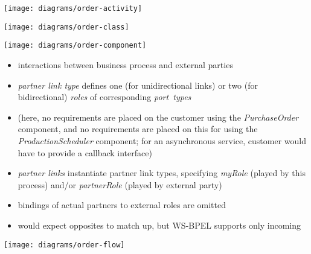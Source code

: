 \documentclass{sepslide-soa-faked} %
\begin{document}
\begin{slide}
\begin{center}
\texttt{[image: diagrams/order-activity]}
\end{center}
\end{slide}

\begin{slide}
\begin{center}
\texttt{[image: diagrams/order-class]}
\end{center}
\end{slide}

\begin{slide}
\begin{center}
\texttt{[image: diagrams/order-component]}
\end{center}
\end{slide}

\begin{slide}
\begin{itemize}
\item interactions between business process and external parties
\item \emph{partner link type} defines one (for unidirectional links) or
  two (for bidirectional) \emph{roles} of corresponding \emph{port~types}
\item (here, no requirements are placed on the customer using the
  \textit{PurchaseOrder} component, and no requirements are placed on this
  for using the \textit{ProductionScheduler} component; for an asynchronous
  service, customer would have to provide a callback interface)
\item \emph{partner links} instantiate partner link types, specifying
  \textit{myRole} (played by this process) and/or \textit{partnerRole}
  (played by external party)
\item bindings of actual partners to external roles are omitted
\item would expect opposites to match up, but WS-BPEL supports only incoming
\end{itemize}
\end{slide}

\begin{slide}
\begin{center}
\texttt{[image: diagrams/order-flow]}
\end{center}
\end{slide}
\end{document}
